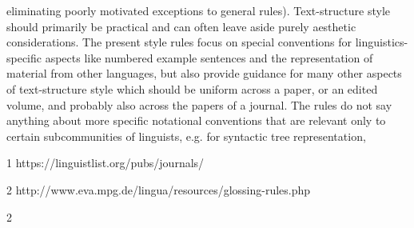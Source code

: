 eliminating poorly motivated exceptions to general rules). Text-structure style should
primarily be practical and can often leave aside purely aesthetic considerations.
The present style rules focus on special conventions for linguistics-specific aspects like
numbered example sentences and the representation of material from other languages, but
also provide guidance for many other aspects of text-structure style which should be
uniform across a paper, or an edited volume, and probably also across the papers of a
journal. The rules do not say anything about more specific notational conventions that are
relevant only to certain subcommunities of linguists, e.g. for syntactic tree representation,
	
 	
 	
 	
 	
 	
 	
 	
 	
 	
 	
 	
 	
 	
 	
 	
 	
 	
 	
 	
 	
 	
 	
 	
 	
 	
 	
 	
 	
 	
 	
 	
 	
 	
 	
 	
 	
 	
 	
 	
 	
 	
 	
 	
 	
 	
 	
 	
 	
 	
 	
 	
 	
 	
 	
	
 
1
https://linguistlist.org/pubs/journals/	
  
2
 http://www.eva.mpg.de/lingua/resources/glossing-rules.php
	
 
 2	
  
